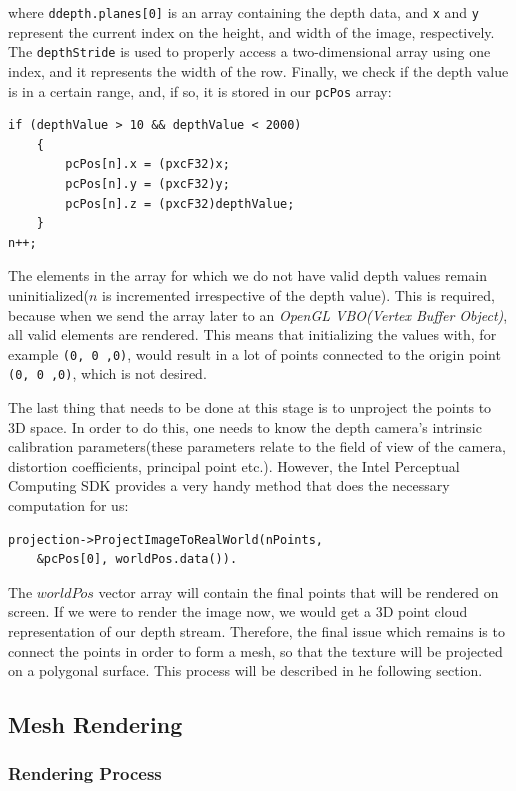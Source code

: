\documentclass[]{article}
\begin{document}
 
where \verb|ddepth.planes[0]| is an array containing the depth data, and  \verb|x| and \verb|y| represent the current index on the height, and width of the image, respectively. The \verb|depthStride| is used to properly access a two-dimensional array using one index, and it represents the width of the row. Finally, we check if the depth value is in a certain range, and, if so, it is stored in our \verb|pcPos| array:
\begin{verbatim}
if (depthValue > 10 && depthValue < 2000)
	{
		pcPos[n].x = (pxcF32)x;
		pcPos[n].y = (pxcF32)y;
		pcPos[n].z = (pxcF32)depthValue;	
	}
n++;
\end{verbatim}
The elements in the array for which we do not have valid depth values remain uninitialized($n$ is incremented irrespective of the depth value). This is required, because when we send the array later to an \textit{OpenGL VBO(Vertex Buffer Object)}, all valid elements are rendered. This means that initializing the values with, for example \verb|(0, 0 ,0)|, would result in a lot of points connected to the origin point \verb|(0, 0 ,0)|, which is not desired.

The last thing that needs to be done at this stage is to unproject the points to 3D space. In order to do this, one needs to know the depth camera's intrinsic calibration parameters(these parameters relate to the field of view of the camera, distortion coefficients, principal point etc.). However, the Intel Perceptual Computing SDK provides a very handy method that does the necessary computation for us:

\begin{verbatim}projection->ProjectImageToRealWorld(nPoints, 
    &pcPos[0], worldPos.data()).\end{verbatim}

The $worldPos$ vector array will contain the final points that will be rendered on screen. If we were to render the image now, we would get a 3D point cloud representation of our depth stream. Therefore, the final issue which remains is to connect the points in order to form a mesh, so that the texture will be projected on a polygonal surface. This process will be described in he following section. 

\subsection{Mesh Rendering}

\subsubsection{Rendering Process}
\end{document}

